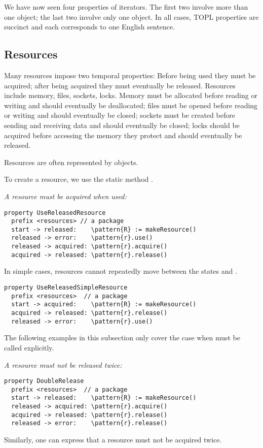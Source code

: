 \documentclass{sigplanconf} %
\newcommand{\delimitVerbatim}{\par\nobreak\smallskip\noindent}
\newcommand{\pattern}[1]{\ensuremath{\mathtt{\underline{#1}}}}
\theoremstyle{definition}
\theoremstyle{remark}
\begin{document}
\medskip
We have now seen four properties of iterators.
The first two involve more than one object;
the last two involve only one object.
In all cases, TOPL properties are succinct and each corresponds to one English sentence.

\subsection{Resources} %

Many resources impose two temporal properties:
Before being used they must be acquired;
after being acquired they must eventually be released.
Resources include memory, files, sockets, locks.
Memory must be allocated before reading or writing and should eventually be deallocated;
files must be opened before reading or writing and should eventually be closed;
sockets must be created before sending and receiving data and should eventually be closed;
locks should be acquired before accessing the memory they protect and should eventually be released.

Resources are often represented by objects.
\delimitVerbatim

\delimitVerbatim
To create a resource, we use the static method \Verb@makeResource@.

\medskip\emph{A resource must be acquired when used:}
\delimitVerbatim
\begin{Verbatim}[commandchars=\\\{\}]
property UseReleasedResource
  prefix <resources> // a package
  start -> released:    \pattern{R} := makeResource()
  released -> error:    \pattern{r}.use()
  released -> acquired: \pattern{r}.acquire()
  acquired -> released: \pattern{r}.release()
\end{Verbatim}

In simple cases, resources cannot repeatedly move between the states \Verb@released@ and \Verb@acquired@.
\delimitVerbatim
\begin{Verbatim}[commandchars=\\\{\}]
property UseReleasedSimpleResource
  prefix <resources>  // a package
  start -> acquired:    \pattern{R} := makeResource()
  acquired -> released: \pattern{r}.release()
  released -> error:    \pattern{r}.use()
\end{Verbatim}
\delimitVerbatim
The following examples in this subsection only cover the case when \Verb@acquire@ must be called explicitly.

\medskip\emph{A resource must not be released twice:}
\delimitVerbatim
\begin{Verbatim}[commandchars=\\\{\}]
property DoubleRelease
  prefix <resources>  // a package
  start -> released:    \pattern{R} := makeResource()
  released -> acquired: \pattern{r}.acquire()
  acquired -> released: \pattern{r}.release()
  released -> error:    \pattern{r}.release()
\end{Verbatim}
\delimitVerbatim
Similarly, one can express that a resource must not be acquired twice.
\end{document}
